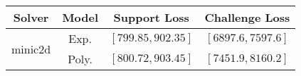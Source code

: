 \begin{tabular}{cc|c|c} 
\hline 
 Solver & Model & Support Loss  & Challenge Loss \tabularnewline\hline 
\hline 
\multirow{2}{*}{minic2d} & Exp. & $\left[799.85,902.35\right]$ & $\left[6897.6,7597.6\right]$ \tabularnewline 
 & Poly. & $\left[800.72,903.45\right]$ & $\left[7451.9,8160.2\right]$ \tabularnewline 
\hline 
\end{tabular} 

